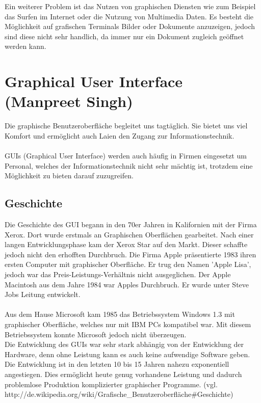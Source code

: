 \documentclass[12pt,a4paper]{report}
\begin{document}
\begin{onehalfspace}
Ein weiterer Problem ist das Nutzen von graphischen Diensten wie zum Beispiel das Surfen im Internet oder die Nutzung von Multimedia Daten. Es besteht die Möglichkeit auf grafischen Terminals Bilder oder Dokumente anzuzeigen, jedoch sind diese nicht sehr handlich, da immer nur ein Dokument zugleich geöffnet werden kann.\\

\newpage
\section{Graphical User Interface (Manpreet Singh)}
Die graphische Benutzeroberfläche begleitet uns tagtäglich. Sie bietet uns viel Komfort und ermöglicht auch Laien den Zugang zur Informationstechnik.\\\\
GUIs (Graphical User Interface) werden auch häufig in Firmen eingesetzt um Personal, welches der Informationstechnik nicht sehr mächtig ist, trotzdem eine Möglichkeit zu bieten darauf zuzugreifen.
\subsection{Geschichte}
Die Geschichte des GUI begann in den 70er Jahren in Kalifornien mit der Firma Xerox. Dort wurde erstmals an Graphischen Oberflächen gearbeitet. Nach einer langen Entwicklungsphase kam der Xerox Star auf den Markt. Dieser schaffte jedoch nicht den erhofften Durchbruch. Die Firma Apple präsentierte 1983 ihren ersten Computer mit graphischer Oberfläche. Er trug den Namen 'Apple Lisa', jedoch war das Preis-Leistungs-Verhältnis nicht ausgeglichen. Der Apple Macintosh aus dem Jahre 1984 war Apples Durchbruch. Er wurde unter Steve Jobs Leitung entwickelt. \\\\
Aus dem Hause Microsoft kam 1985 das Betriebssystem Windows 1.3 mit graphischer Oberfläche, welches nur mit IBM PCs kompatibel war. Mit diesem Betriebssystem konnte Microsoft jedoch nicht überzeugen.\\

Die Entwicklung des GUIs war sehr stark abhängig von der Entwicklung der Hardware, denn ohne Leistung  kann es auch keine aufwendige Software geben.\\

Die Entwicklung  ist in den letzten 10 bis 15 Jahren nahezu exponentiell angestiegen. Dies ermöglicht heute genug vorhandene Leistung und dadurch problemlose Produktion komplizierter graphischer Programme.  (vgl. http://de.wikipedia.org/wiki/Grafische\_Benutzeroberfläche\#Geschichte)


\end{onehalfspace}
\end{document}
